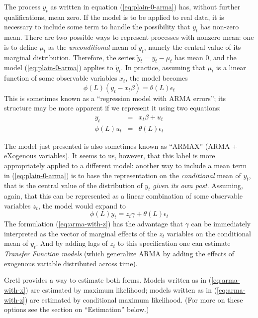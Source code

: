 The process $y_t$ as written in equation (\ref{eq:plain-0-arma}) has,
without further qualifications, mean zero. If the model is to be
applied to real data, it is necessary to include some term to handle
the possibility that $y_t$ has non-zero mean. There are two possible
ways to represent processes with nonzero mean: one is to define $\mu_t$
as the \emph{unconditional} mean of $y_t$, namely the central value of
its marginal distribution. Therefore, the series $\tilde{y}_t = y_t -
\mu_t$ has mean 0, and the model (\ref{eq:plain-0-arma}) applies to
$\tilde{y}_t$. In practice, assuming that $\mu_t$ is a linear function
of some observable variables $x_t$, the model becomes
\begin{equation}
  \label{eq:arma-with-x}
  \phi(L) (y_t - x_t \beta) = \theta(L) \epsilon_t
\end{equation}
This is sometimes known as a ``regression model with ARMA errors'';
its structure may be more apparent if we represent it using two
equations:
\begin{eqnarray*}
  y_t & = & x_t \beta + u_t \\
  \phi(L) u_t & = & \theta(L) \epsilon_t
\end{eqnarray*}

The model just presented is also sometimes known as ``ARMAX'' (ARMA +
eXogenous variables).  It seems to us, however, that this label is
more appropriately applied to a different model: another way to
include a mean term in (\ref{eq:plain-0-arma}) is to base the
representation on the \emph{conditional} mean of $y_t$, that is the
central value of the distribution of $y_t$ \emph{given its own past}.
Assuming, again, that this can be represented as a linear combination
of some observable variables $z_t$, the model would expand to
\begin{equation}
  \label{eq:arma-with-z}
  \phi(L) y_t = z_t \gamma + \theta(L) \epsilon_t
\end{equation}
The formulation (\ref{eq:arma-with-z}) has the advantage that $\gamma$
can be immediately interpreted as the vector of marginal effects of
the $z_t$ variables on the conditional mean of $y_t$.  And by adding
lags of $z_t$ to this specification one can estimate \emph{Transfer
  Function models} (which generalize ARMA by adding the effects of
exogenous variable distributed across time).

Gretl provides a way to estimate both forms. Models written as
in (\ref{eq:arma-with-x}) are estimated by maximum likelihood; models
written as in (\ref{eq:arma-with-z}) are estimated by conditional
maximum likelihood. (For more on these options see the section on
``Estimation'' below.)  

